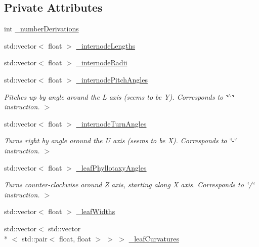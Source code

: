 \subsection*{Private Attributes}
\begin{DoxyCompactItemize}
\item 
int \hyperlink{classLSystemParameters_aa6c15efa6da78e759317beebcd63072d}{\-\_\-number\-Derivations}
\item 
std\-::vector$<$ float $>$ \hyperlink{classLSystemParameters_a2465e8385f6f4a44e6066b8e373f911a}{\-\_\-internode\-Lengths}
\item 
std\-::vector$<$ float $>$ \hyperlink{classLSystemParameters_aed5693a39acfe7da5f2338a470fa56da}{\-\_\-internode\-Radii}
\item 
std\-::vector$<$ float $>$ \hyperlink{classLSystemParameters_a262a0b893a9ef18489b35cce0b6053b6}{\-\_\-internode\-Pitch\-Angles}
\begin{DoxyCompactList}\small\item\em Pitches up by angle around the L axis (seems to be Y). Corresponds to \char`\"{}$^\wedge$\char`\"{} instruction. $>$ \end{DoxyCompactList}\item 
std\-::vector$<$ float $>$ \hyperlink{classLSystemParameters_af078859120313ef883b1ac15dddc8330}{\-\_\-internode\-Turn\-Angles}
\begin{DoxyCompactList}\small\item\em Turns right by angle around the U axis (seems to be X). Corresponds to \char`\"{}-\/\char`\"{} instruction. $>$ \end{DoxyCompactList}\item 
std\-::vector$<$ float $>$ \hyperlink{classLSystemParameters_ad34438ab953227fe2810433f2c0fbcd6}{\-\_\-leaf\-Phyllotaxy\-Angles}
\begin{DoxyCompactList}\small\item\em Turns counter-\/clockwise around Z axis, starting along X axis. Corresponds to \char`\"{}/\char`\"{} instruction. $>$ \end{DoxyCompactList}\item 
std\-::vector$<$ float $>$ \hyperlink{classLSystemParameters_afdad1e5edf4a2d3f00012f0ad8d5d6f3}{\-\_\-leaf\-Widths}
\item 
std\-::vector$<$ std\-::vector\\*
$<$ std\-::pair$<$ float, float $>$ $>$ $>$ \hyperlink{classLSystemParameters_a257d10b96cb874d2756013098f8c7095}{\-\_\-leaf\-Curvatures}
\end{DoxyCompactItemize}


